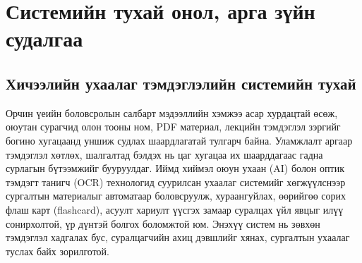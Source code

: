 

\chapter{Системийн тухай онол, арга зүйн судалгаа} 

\section{Хичээлийн ухаалаг тэмдэглэлийн системийн тухай}
Орчин үеийн боловсролын салбарт мэдээллийн хэмжээ асар хурдацтай өсөж, оюутан сурагчид олон тооны ном, PDF материал, лекцийн тэмдэглэл зэргийг богино хугацаанд уншиж судлах шаардлагатай тулгарч байна. Уламжлалт аргаар тэмдэглэл хөтлөх, шалгалтад бэлдэх нь цаг хугацаа их шаарддагаас гадна сурлагын бүтээмжийг бууруулдаг. Иймд хиймэл оюун ухаан (AI) болон оптик тэмдэгт танигч (OCR) технологид суурилсан ухаалаг системийг хөгжүүлснээр сургалтын материалыг автоматаар боловсруулж, хураангуйлах, өөрийгөө сорих флаш карт (flashcard), асуулт хариулт үүсгэх замаар суралцах үйл явцыг илүү сонирхолтой, үр дүнтэй болгох боломжтой юм. Энэхүү систем нь зөвхөн тэмдэглэл хадгалах бус, суралцагчийн ахиц дэвшлийг хянах, сургалтын ухаалаг туслах байх зорилготой.


